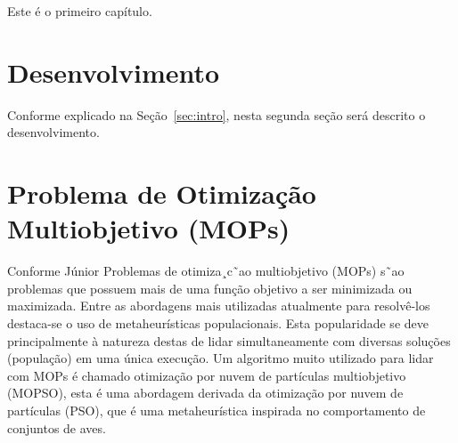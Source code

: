 Este \'e o primeiro cap\'itulo. 
 


\section{Desenvolvimento}\label{sec:desenv}

Conforme explicado na Se\c{c}\~ao~\ref{sec:intro}, nesta segunda se\c{c}\~ao ser\'a descrito o desenvolvimento.


\section{Problema de Otimização Multiobjetivo (MOPs)}\label{sec:mops}

Conforme Júnior \cite{olacir2013} Problemas de otimiza¸c˜ao multiobjetivo (MOPs) s˜ao problemas que possuem mais de uma função objetivo a ser minimizada ou maximizada. Entre as abordagens mais utilizadas atualmente para resolvê-los destaca-se o uso de metaheurísticas populacionais. Esta popularidade se deve principalmente à natureza destas de lidar simultaneamente com diversas soluções (população) em uma única execução.
Um algoritmo muito utilizado para lidar com MOPs é chamado otimização por nuvem de partículas multiobjetivo (MOPSO), esta é uma abordagem derivada da otimização por nuvem de partículas (PSO), que é uma metaheurística inspirada no comportamento de conjuntos de aves.
